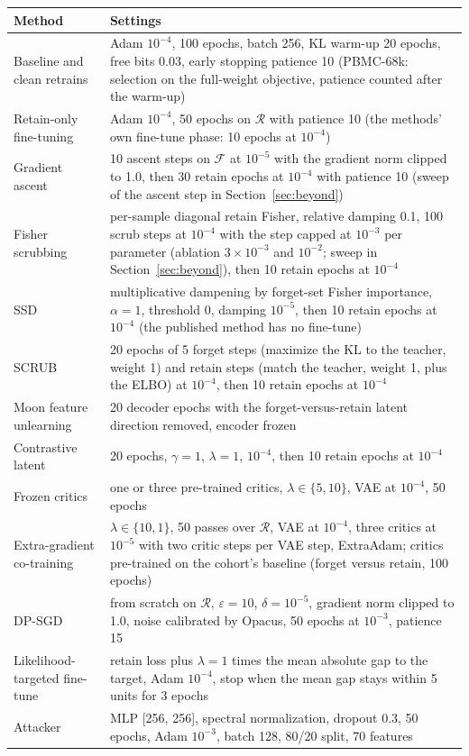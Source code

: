 \begin{tabular}{lp{}}
\toprule
Method & Settings \\
\midrule
Baseline and clean retrains & Adam $10^{-4}$, 100 epochs, batch 256, KL warm-up 20 epochs, free bits 0.03, early stopping patience 10 (PBMC-68k: selection on the full-weight objective, patience counted after the warm-up) \\
Retain-only fine-tuning & Adam $10^{-4}$, 50 epochs on $\mathcal{R}$ with patience 10 (the methods' own fine-tune phase: 10 epochs at $10^{-4}$) \\
Gradient ascent & 10 ascent steps on $\mathcal{F}$ at $10^{-5}$ with the gradient norm clipped to 1.0, then 30 retain epochs at $10^{-4}$ with patience 10 (sweep of the ascent step in Section~\ref{sec:beyond}) \\
Fisher scrubbing & per-sample diagonal retain Fisher, relative damping 0.1, 100 scrub steps at $10^{-4}$ with the step capped at $10^{-3}$ per parameter (ablation $3 \times 10^{-3}$ and $10^{-2}$; sweep in Section~\ref{sec:beyond}), then 10 retain epochs at $10^{-4}$ \\
SSD & multiplicative dampening by forget-set Fisher importance, $\alpha = 1$, threshold 0, damping $10^{-5}$, then 10 retain epochs at $10^{-4}$ (the published method has no fine-tune) \\
SCRUB & 20 epochs of 5 forget steps (maximize the KL to the teacher, weight 1) and retain steps (match the teacher, weight 1, plus the ELBO) at $10^{-4}$, then 10 retain epochs at $10^{-4}$ \\
Moon feature unlearning & 20 decoder epochs with the forget-versus-retain latent direction removed, encoder frozen \\
Contrastive latent & 20 epochs, $\gamma = 1$, $\lambda = 1$, $10^{-4}$, then 10 retain epochs at $10^{-4}$ \\
Frozen critics & one or three pre-trained critics, $\lambda \in \{5, 10\}$, VAE at $10^{-4}$, 50 epochs \\
Extra-gradient co-training & $\lambda \in \{10, 1\}$, 50 passes over $\mathcal{R}$, VAE at $10^{-4}$, three critics at $10^{-5}$ with two critic steps per VAE step, ExtraAdam; critics pre-trained on the cohort's baseline (forget versus retain, 100 epochs) \\
DP-SGD & from scratch on $\mathcal{R}$, $\varepsilon = 10$, $\delta = 10^{-5}$, gradient norm clipped to 1.0, noise calibrated by Opacus, 50 epochs at $10^{-3}$, patience 15 \\
Likelihood-targeted fine-tune & retain loss plus $\lambda = 1$ times the mean absolute gap to the target, Adam $10^{-4}$, stop when the mean gap stays within 5 units for 3 epochs \\
Attacker & MLP [256, 256], spectral normalization, dropout 0.3, 50 epochs, Adam $10^{-3}$, batch 128, 80/20 split, 70 features \\
\bottomrule
\end{tabular}

